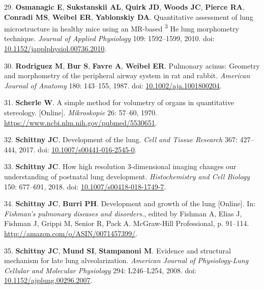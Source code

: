 \documentclass[
  american,
]{article}
\newenvironment{cslreferences}%
  {}%
  {\par}
\begin{document}
\begin{cslreferences}
\leavevmode\hypertarget{ref-LzalnLBH}{}%
29. \textbf{Osmanagic E}, \textbf{Sukstanskii AL}, \textbf{Quirk JD}, \textbf{Woods JC}, \textbf{Pierce RA}, \textbf{Conradi MS}, \textbf{Weibel ER}, \textbf{Yablonskiy DA}. Quantitative assessment of lung microstructure in healthy mice using an MR-based \textsuperscript{3} He lung morphometry technique. \emph{Journal of Applied Physiology} 109: 1592--1599, 2010. doi: \href{https://doi.org/10.1152/japplphysiol.00736.2010}{10.1152/japplphysiol.00736.2010}.

\leavevmode\hypertarget{ref-1GJECnKBu}{}%
30. \textbf{Rodriguez M}, \textbf{Bur S}, \textbf{Favre A}, \textbf{Weibel ER}. Pulmonary acinus: Geometry and morphometry of the peripheral airway system in rat and rabbit. \emph{American Journal of Anatomy} 180: 143--155, 1987. doi: \href{https://doi.org/10.1002/aja.1001800204}{10.1002/aja.1001800204}.

\leavevmode\hypertarget{ref-KGbSQovR}{}%
31. \textbf{Scherle W}. A simple method for volumetry of organs in quantitative stereology. {[}Online{]}. \emph{Mikroskopie} 26: 57--60, 1970. \url{https://www.ncbi.nlm.nih.gov/pubmed/5530651}.

\leavevmode\hypertarget{ref-XQLPrPTJ}{}%
32. \textbf{Schittny JC}. Development of the lung. \emph{Cell and Tissue Research} 367: 427--444, 2017. doi: \href{https://doi.org/10.1007/s00441-016-2545-0}{10.1007/s00441-016-2545-0}.

\leavevmode\hypertarget{ref-ODQCVC23}{}%
33. \textbf{Schittny JC}. How high resolution 3-dimensional imaging changes our understanding of postnatal lung development. \emph{Histochemistry and Cell Biology} 150: 677--691, 2018. doi: \href{https://doi.org/10.1007/s00418-018-1749-7}{10.1007/s00418-018-1749-7}.

\leavevmode\hypertarget{ref-TsNwin2E}{}%
34. \textbf{Schittny JC}, \textbf{Burri PH}. Development and growth of the lung {[}Online{]}. In: \emph{Fishman's pulmonary diseases and disorders.}, edited by Fishman A, Elias J, Fishman J, Grippi M, Senior R, Pack A. McGraw-Hill Professional, p. 91--114. \url{http://amazon.com/o/ASIN/0071457399/}.

\leavevmode\hypertarget{ref-d1YV8oOK}{}%
35. \textbf{Schittny JC}, \textbf{Mund SI}, \textbf{Stampanoni M}. Evidence and structural mechanism for late lung alveolarization. \emph{American Journal of Physiology-Lung Cellular and Molecular Physiology} 294: L246--L254, 2008. doi: \href{https://doi.org/10.1152/ajplung.00296.2007}{10.1152/ajplung.00296.2007}.


\end{cslreferences}
\end{document}
